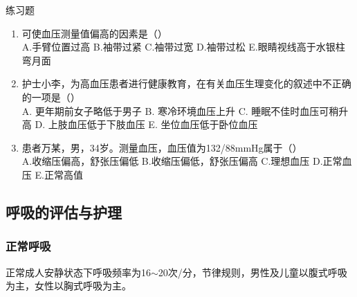 \documentclass[11pt, a4paper]{ctexart}
\begin{document}
\begin{examplebox}{练习题}
	\begin{enumerate}
		\item 可使血压测量值偏高的因素是（\qquad）\\
		      A.手臂位置过高 \quad B.袖带过紧 \quad C.袖带过宽 \quad D.袖带过松 \quad E.眼睛视线高于水银柱弯月面
		\item 护士小李，为高血压患者进行健康教育，在有关血压生理变化的叙述中不正确的一项是（\qquad）\\
		      A. 更年期前女子略低于男子 \quad B. 寒冷环境血压上升 \quad C. 睡眠不佳时血压可稍升高 \quad D. 上肢血压低于下肢血压 \quad E. 坐位血压低于卧位血压
		\item 患者万某，男，34岁。测量血压，血压值为132/88mmHg属于（\qquad）\\
		      A.收缩压偏高，舒张压偏低 \quad B.收缩压偏低，舒张压偏高 \quad C.理想血压 \quad D.正常血压 \quad E.正常高值
	\end{enumerate}
\end{examplebox}

\subsection{呼吸的评估与护理}
\subsubsection{正常呼吸}
正常成人安静状态下呼吸频率为16$\sim$20次/分，节律规则，男性及儿童以腹式呼吸为主，女性以胸式呼吸为主。
\end{document}
